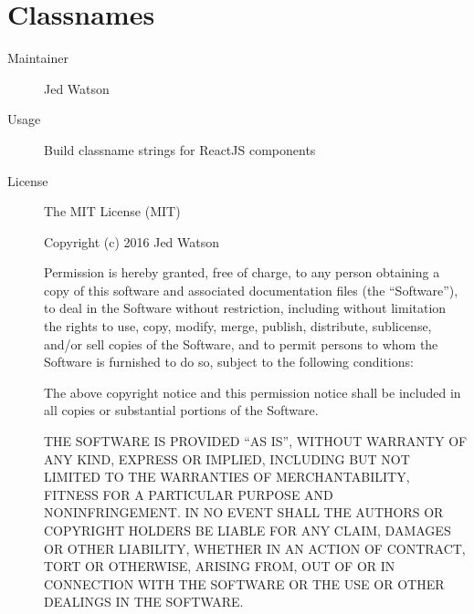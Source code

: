   \section*{Classnames}
    \begin{description}
      \item[Maintainer] Jed Watson
      \item[Usage] Build classname strings for ReactJS components
      \item[License] \scriptsize The MIT License (MIT)

        Copyright (c) 2016 Jed Watson

        Permission is hereby granted, free of charge, to any person obtaining a copy
        of this software and associated documentation files (the ``Software''), to deal
        in the Software without restriction, including without limitation the rights
        to use, copy, modify, merge, publish, distribute, sublicense, and/or sell
        copies of the Software, and to permit persons to whom the Software is
        furnished to do so, subject to the following conditions:

        The above copyright notice and this permission notice shall be included in all
        copies or substantial portions of the Software.

        THE SOFTWARE IS PROVIDED ``AS IS'', WITHOUT WARRANTY OF ANY KIND, EXPRESS OR
        IMPLIED, INCLUDING BUT NOT LIMITED TO THE WARRANTIES OF MERCHANTABILITY,
        FITNESS FOR A PARTICULAR PURPOSE AND NONINFRINGEMENT. IN NO EVENT SHALL THE
        AUTHORS OR COPYRIGHT HOLDERS BE LIABLE FOR ANY CLAIM, DAMAGES OR OTHER
        LIABILITY, WHETHER IN AN ACTION OF CONTRACT, TORT OR OTHERWISE, ARISING FROM,
        OUT OF OR IN CONNECTION WITH THE SOFTWARE OR THE USE OR OTHER DEALINGS IN THE
        SOFTWARE.
    \end{description}

